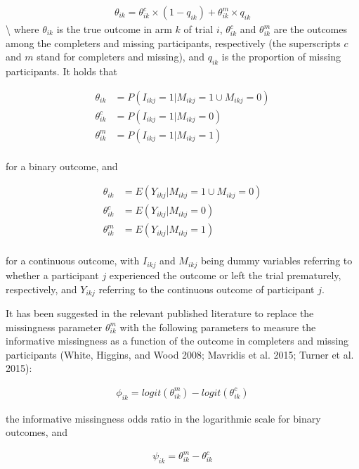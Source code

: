 \[\begin{aligned}
\theta_{ik} = \theta^{c}_{ik} \times (1 - q_{ik}) + \theta^{m}_{ik} \times q_{ik}
\end{aligned}\]
\textbackslash{}
where \(\theta_{ik}\) is the true outcome in arm \(k\) of trial \(i\), \(\theta^{c}_{ik}\)
and \(\theta^{m}_{ik}\) are the outcomes among the completers and missing participants,
respectively (the superscripts \(c\) and \(m\) stand for completers and missing), and
\(q_{ik}\) is the proportion of missing participants. It holds that

\[\begin{aligned}
\theta_{ik} &= P(I_{ikj} = 1 | M_{ikj} = 1 \cup M_{ikj} = 0) \\
\theta^{c}_{ik} &= P(I_{ikj} = 1 | M_{ikj} = 0) \\
\theta^{m}_{ik} &= P(I_{ikj} = 1 | M_{ikj} = 1) \\
\end{aligned}\]

for a binary outcome, and

\[\begin{aligned}
\theta_{ik} &= E(Y_{ikj} | M_{ikj} = 1 \cup M_{ikj} = 0) \\
\theta^{c}_{ik} &= E(Y_{ikj} | M_{ikj} = 0) \\
\theta^{m}_{ik} &= E(Y_{ikj} | M_{ikj} = 1) \\
\end{aligned}\]

for a continuous outcome, with \(I_{ikj}\) and \(M_{ikj}\) being dummy variables
referring to whether a participant \(j\) experienced the outcome or left the trial
prematurely, respectively, and \(Y_{ikj}\) referring to the continuous outcome of
participant \(j\).

It has been suggested in the relevant published literature to replace the missingness
parameter \(\theta^{m}_{ik}\) with the following parameters to measure the informative
missingness as a function of the outcome in completers and missing participants
(White, Higgins, and Wood 2008; Mavridis et al. 2015; Turner et al. 2015):

\[\begin{aligned}
\phi_{ik} = logit(\theta^{m}_{ik}) - logit(\theta^{c}_{ik})
\end{aligned}\]

the informative missingness odds ratio in the logarithmic scale for binary outcomes,
and

\[\begin{aligned}
\psi_{ik} = \theta^{m}_{ik} - \theta^{c}_{ik}
\end{aligned}\]

